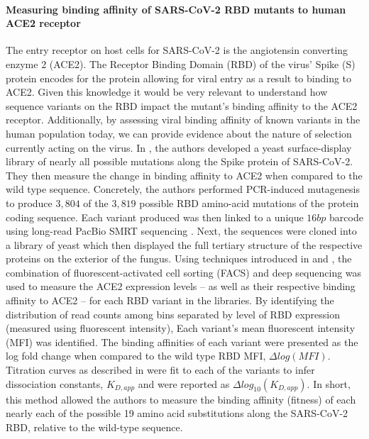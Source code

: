\documentclass{article}
\begin{document}
\paragraph{Measuring binding affinity of SARS-CoV-2 RBD mutants to human ACE2 receptor}
The entry receptor on host cells for SARS-CoV-2 is the angiotensin converting enzyme 2 (ACE2).
The Receptor Binding Domain (RBD) of the virus' Spike (S) protein encodes for the protein allowing for viral entry as a result to binding to ACE2.
Given this knowledge it would be very relevant to understand how sequence variants on the RBD impact the mutant's binding affinity to the ACE2 receptor.
Additionally, by assessing viral binding affinity of known variants in the human population today, we can provide evidence about the nature of selection currently acting on the virus.
In \citet{Starr2020}, the  authors developed a yeast surface-display library of nearly all possible mutations along the Spike protein of SARS-CoV-2.
They then measure the change in binding affinity to ACE2 when compared to the wild type sequence.
Concretely, the authors performed PCR-induced mutagenesis to produce $3,804$ of the $3,819$ possible RBD amino-acid mutations of the protein coding sequence.
Each variant produced was then linked to a unique $16bp$ barcode using long-read PacBio SMRT sequencing \citep{Matreyek2018}.
Next, the sequences were cloned into a library of yeast which then displayed the full tertiary structure of the respective proteins on the exterior of the fungus.
Using techniques introduced in \citet{Adams2016} and \citet{Peterman2016}, the combination of fluorescent-activated cell sorting (FACS) and deep sequencing was used to measure the ACE2 expression levels -- as well as their respective binding affinity to ACE2 -- for each RBD variant in the libraries. 
By identifying the distribution of read counts among bins separated by level of RBD expression (measured using fluorescent intensity), Each variant's mean fluorescent intensity (MFI) was identified.
The binding affinities of each variant were presented as the log fold change when compared to the wild type RBD MFI, $\Delta log(MFI)$.
Titration curves as described in \citet{Peterman2016} were fit to each of the variants to infer dissociation constants, $K_{D, app}$ and were reported as $\Delta log_{10}(K_{D, app})$.
In short, this method allowed the authors to measure the binding affinity (fitness) of each nearly each of the possible 19 amino acid substitutions along the SARS-CoV-2 RBD, relative to the wild-type sequence.
\end{document}
